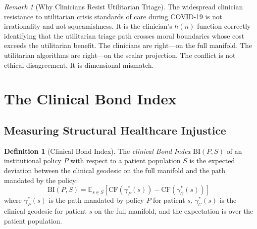 \documentclass[12pt]{article}
\theoremstyle{definition}
\newtheorem{definition}[theorem]{Definition}
\theoremstyle{remark}
\newtheorem{remark}[theorem]{Remark}
\newcommand{\C}{\mathcal{C}}               %
\newcommand{\CF}{\mathrm{CF}}              %
\newcommand{\BI}{\mathrm{BI}}              %
\begin{document}
\begin{remark}[Why Clinicians Resist Utilitarian Triage]
The widespread clinician resistance to utilitarian crisis standards of care during COVID-19 \cite{greenberg2020,emanuel2020} is not irrationality and not squeamishness.  It is the clinician's $h(n)$ function correctly identifying that the utilitarian triage path crosses moral boundaries whose cost exceeds the utilitarian benefit.  The clinicians are right---on the full manifold.  The utilitarian algorithms are right---on the scalar projection.  The conflict is not ethical disagreement.  It is dimensional mismatch.
\end{remark}


\section{The Clinical Bond Index}
\label{sec:bond_index}

\subsection{Measuring Structural Healthcare Injustice}

\begin{definition}[Clinical Bond Index]
\label{def:clinical_bi}
The \emph{clinical Bond Index} $\BI(P, S)$ of an institutional policy $P$ with respect to a patient population $S$ is the expected deviation between the clinical geodesic on the full manifold and the path mandated by the policy:
\begin{equation}
\BI(P, S) = \mathbb{E}_{s \in S}\left[\CF(\gamma_P^*(s)) - \CF(\gamma_\C^*(s))\right]
\label{eq:clinical_bi}
\end{equation}
where $\gamma_P^*(s)$ is the path mandated by policy $P$ for patient $s$, $\gamma_\C^*(s)$ is the clinical geodesic for patient $s$ on the full manifold, and the expectation is over the patient population.
\end{definition}
\end{document}
